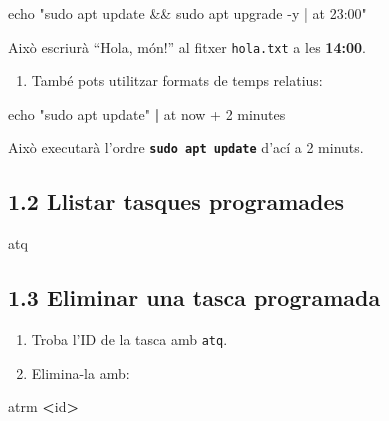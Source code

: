 \documentclass[
  12 pt,
  a4paper,
]{article}
\newenvironment{Shaded}{\begin{snugshade}}{\end{snugshade}}
\newcommand{\BuiltInTok}[1]{#1}
\newcommand{\ExtensionTok}[1]{#1}
\newcommand{\KeywordTok}[1]{\textcolor[rgb]{0.13,0.29,0.53}{\textbf{#1}}}
\newcommand{\NormalTok}[1]{#1}
\newcommand{\OperatorTok}[1]{\textcolor[rgb]{0.81,0.36,0.00}{\textbf{#1}}}
\newcommand{\StringTok}[1]{\textcolor[rgb]{0.31,0.60,0.02}{#1}}
\providecommand{\tightlist}{%
  \setlength{\itemsep}{0pt}\setlength{\parskip}{0pt}}
\begin{document}
\begin{Shaded}
\begin{Highlighting}[]
\BuiltInTok{echo} \StringTok{"sudo apt update \&\& sudo apt upgrade {-}y | at 23:00"}
\end{Highlighting}
\end{Shaded}

Això escriurà ``Hola, món!'' al fitxer \texttt{hola.txt} a les
\textbf{14:00}.

\begin{enumerate}
\def\labelenumi{\arabic{enumi}.}
\setcounter{enumi}{1}
\tightlist
\item
  També pots utilitzar formats de temps relatius:
\end{enumerate}

\begin{Shaded}
\begin{Highlighting}[]
\BuiltInTok{echo} \StringTok{"sudo apt update"} \KeywordTok{|} \ExtensionTok{at}\NormalTok{ now + 2 minutes}
\end{Highlighting}
\end{Shaded}

Això executarà l'ordre \textbf{\texttt{sudo\ apt\ update}} d'ací a 2
minuts.

\subsection{1.2 Llistar tasques
programades}\label{llistar-tasques-programades}

\begin{Shaded}
\begin{Highlighting}[]
\ExtensionTok{atq}
\end{Highlighting}
\end{Shaded}

\subsection{1.3 Eliminar una tasca
programada}\label{eliminar-una-tasca-programada}

\begin{enumerate}
\def\labelenumi{\arabic{enumi}.}
\item
  Troba l'ID de la tasca amb \texttt{atq}.
\item
  Elimina-la amb:
\end{enumerate}

\begin{Shaded}
\begin{Highlighting}[]
\ExtensionTok{atrm} \OperatorTok{\textless{}}\NormalTok{id}\OperatorTok{\textgreater{}}
\end{Highlighting}
\end{Shaded}
\end{document}
